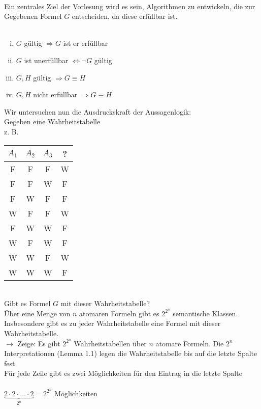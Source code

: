 \noindent\\
Ein zentrales Ziel der Vorlesung wird es sein, Algorithmen zu entwickeln, die zur Gegebenen Formel $G$ entscheiden, da diese erfüllbar ist.\\
    
\noindent\\
\bemerkung{}
\begin{enumerate}[i)]
\item $G$ gültig $\Rightarrow G$ ist er erfüllbar
\item $G$ ist unerfüllbar $\Leftrightarrow \neg G$ gültig
\item $G, H$ gültig $\Rightarrow G \equiv H$
\item $G, H$ nicht erfüllbar $\Rightarrow G \equiv H$
\end{enumerate}

\noindent
Wir untersuchen nun die Ausdruckskraft der Aussagenlogik:\\
Gegeben eine Wahrheitstabelle\\
z. B.\\
\begin{tabular}{c|c|c|c}
$A_1$ & $A_2$ & $A_3$ & ?\\
\hline
F & F & F & W\\
F & F & W & F\\
F & W & F & F\\
W & F & F & W\\
F & W & W & F\\
W & F & W & F\\
W & W & F & W\\
W & W & W & F
\end{tabular}\\
Gibt es Formel $G$ mit dieser Wahrheitstabelle?\\

Über eine Menge von $n$ atomaren Formeln gibt es $2^{2^{n}}$ semantische Klassen. Insbesondere gibt es zu jeder Wahrheitstabelle eine Formel mit dieser Wahrheitstabelle.\\
    
\beweis{}
$\rightarrow$ Zeige: Es gibt $2^{2^n}$ Wahrheitstabellen über $n$ atomare Formeln. Die $2^n$ Interpretationen (Lemma 1.1) legen die Wahrheitstabelle bis auf die letzte Spalte fest.\\
Für jede Zeile gibt es zwei Möglichkeiten für den Eintrag in die letzte Spalte\\
\noindent\\
$\underbrace{2 \cdot 2 \cdot … \cdot 2}_{2^n} = 2^{2^n}$ Möglichkeiten\\
    
